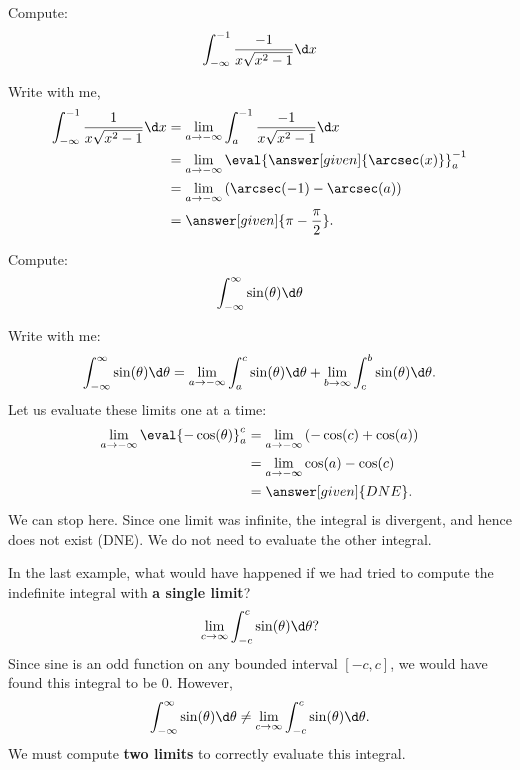 \documentclass{ximera}
\begin{document}
\begin{example}	
  Compute:
  \[
  \int_{-\infty}^{-1}\frac{-1}{x\sqrt{x^2-1}} \d x
  \]
  \begin{explanation}
    Write with me,
    \begin{align*}
      \int_{-\infty}^{-1} \frac{1}{x\sqrt{x^2-1}} \d x &= \lim_{a \to -\infty} \int_{a}^{-1} \frac{-1}{x\sqrt{x^2-1}}\d x\\
      &= \lim_{a \to -\infty} \eval{\answer[given]{\arcsec(x)}}_{a}^{-1} \\
      &= \lim_{a \to -\infty} \left(\arcsec(-1) - \arcsec(a)\right)\\
      &= \answer[given]{\pi - \frac{\pi}{2}}.
    \end{align*}
  \end{explanation}
  \end{example}

\begin{example}	
  Compute:
  \[
  \int_{-\infty}^\infty \sin(\theta) \d \theta
  \]
  \begin{explanation}
    Write with me:
    \[
    \int_{-\infty}^\infty \sin(\theta) \d \theta = \lim_{a\to -\infty} \int_a^c \sin(\theta) \d \theta + \lim_{b\to\infty}\int_c^b \sin(\theta) \d \theta.
    \]
    Let us evaluate these limits one at a time:
    \begin{align*}  
      \lim_{a\to -\infty}\eval{-\cos(\theta)}_a^c &= \lim_{a\to -\infty}\left(-\cos(c)+\cos(a)\right)\\
      &= \lim_{a\to -\infty} \cos(a) -\cos(c)\\
      &= \answer[given]{DNE}.
    \end{align*}
    We can stop here. Since one limit was infinite, the integral is
    divergent, and hence does not exist (DNE). We do not need to evaluate the other integral.
  \end{explanation}
\end{example}


\begin{warning}
In the last example, what would have happened if we had tried to
compute the indefinite integral with \textbf{a single limit}?
\[
\lim_{c\to \infty}\int_{-c}^c \sin(\theta)\d \theta?
\]
Since sine is an odd function on any bounded interval $[-c,c]$, we
would have found this integral to be $0$. However,
\[
\int_{-\infty}^\infty \sin(\theta) \d \theta \ne \lim_{c\to \infty}\int_{-c}^c \sin(\theta)\d \theta.
\]
We must compute \textbf{two limits} to correctly evaluate this
integral.
\end{warning}
\end{document}
